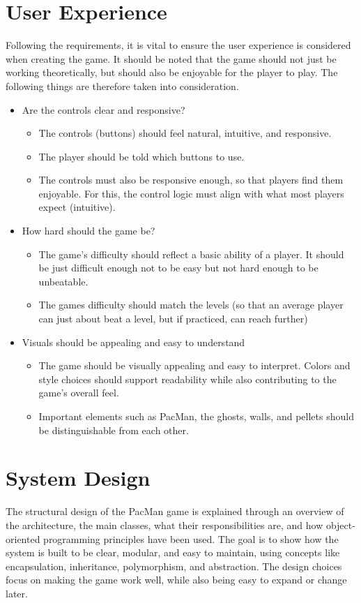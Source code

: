 \documentclass[a4paper,5pt]{article}
\begin{document}
\section{User Experience} \label{userexp}
Following the requirements, it is vital to ensure the user experience is considered when creating the game. It should be noted that the game should not just be working theoretically, but should also be enjoyable for the player to play. The following things are therefore taken into consideration.
\begin{itemize}
    \item Are the controls clear and responsive?
        \begin{itemize}
            \item The controls (buttons) should feel natural, intuitive, and responsive.
            \item The player should be told which buttons to use.
            \item The controls must also be responsive enough, so that players find them enjoyable. For this, the control logic must align with what most players expect (intuitive).
        \end{itemize}
    \item How hard should the game be?
        \begin{itemize}
            \item The game's difficulty should reflect a basic ability of a player. It should be just difficult enough not to be easy but not hard enough to be unbeatable.
            \item The games difficulty should match the levels (so that an average player can just about beat a level, but if practiced, can reach further)
        \end{itemize}
    \item Visuals should be appealing and easy to understand
        \begin{itemize}
            \item The game should be visually appealing and easy to interpret. Colors and style choices should support readability while also contributing to the game's overall feel.
            \item Important elements such as PacMan, the ghosts, walls, and pellets should be distinguishable from each other.
        \end{itemize}
\end{itemize}

\newpage
\section{System Design}
The structural design of the PacMan game is explained through an overview of the architecture, the main classes, what their responsibilities are, and how object-oriented programming principles have been used. The goal is to show how the system is built to be clear, modular, and easy to maintain, using concepts like encapsulation, inheritance, polymorphism, and abstraction. The design choices focus on making the game work well, while also being easy to expand or change later.
\end{document}
